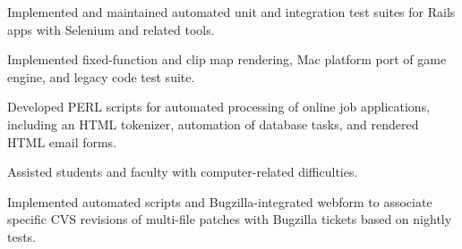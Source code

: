 \documentclass[]{jhearn-resume}
\begin{document}
\begin{minipage}[t]{0.64\textwidth}
\begin{tightemize}
\item Implemented and maintained automated unit and integration test suites for Rails apps with Selenium and related tools.
\end{tightemize}
\sectionsep

\begin{tightemize}
\item Implemented fixed-function and clip map rendering, Mac platform port of game engine, and legacy code test suite.
\end{tightemize}
\sectionsep

\begin{tightemize}
\item Developed PERL scripts for automated processing of online job applications, including an HTML tokenizer, automation of database tasks, and rendered HTML email forms.
\item Assisted students and faculty with computer-related difficulties.
\end{tightemize}
\sectionsep

\begin{tightemize}
\item Implemented automated scripts and Bugzilla-integrated webform to
associate specific CVS revisions of multi-file patches with Bugzilla tickets based on nightly tests.
\end{tightemize}
\sectionsep

\end{minipage}
\hfill
\end{document}
